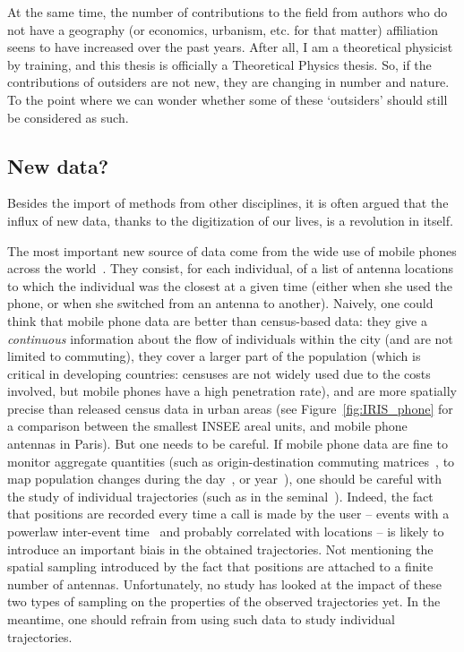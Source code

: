 At the same time, the number of contributions to the field from authors who do
not have a geography (or economics, urbanism, etc. for that matter) affiliation
seens to have increased over the past years. After all, I am a theoretical physicist
by training, and this thesis is officially a Theoretical Physics thesis. So, if
the contributions of outsiders are not new, they are changing in number and
nature. To the point where we can wonder whether some of these `outsiders'
should still be considered as such.



\subsection{New data?}
\label{sub:new_data}

Besides the import of methods from other disciplines, it is often argued that
the influx of new data, thanks to the digitization of our lives, is a revolution
in itself. 

The most important new source of data come from the wide use of mobile phones
across the world~\cite{Gonzalez:2008,Fen-Chong:2012}. They consist, for each individual, of a
list of antenna locations to which the individual was the closest at a given time
(either when she used the phone, or when she switched from an antenna to another).
Naively, one could think that mobile phone data are better than census-based
data: they give a \emph{continuous} information about the flow of individuals
within the city (and are not limited to commuting), they cover a larger part of
the population (which is critical in developing countries: censuses are not
widely used due to the costs involved, but mobile phones have a high
penetration rate), and are more spatially precise than released census data in
urban areas (see Figure~\ref{fig:IRIS_phone} for a comparison between the smallest
INSEE areal units, and mobile phone antennas in Paris). But one needs to be
careful. If mobile phone data are fine to monitor aggregate quantities (such as
origin-destination commuting matrices~\cite{Lenormand:2014}, to map
population changes during the day~\cite{Louail:2014}, or year~\cite{Deville:2014}), one should be careful with the study of
individual trajectories (such as in the
seminal~\cite{Gonzalez:2008,Song:2010_modelling,Song:2010_limits}). Indeed, the
fact that positions are recorded every time a call is made by the user -- 
events with a powerlaw inter-event time~\cite{Song:2010_modelling} and 
probably correlated with locations -- is likely to introduce an important biais in
the obtained trajectories. Not mentioning the spatial sampling introduced by the
fact that positions are attached to a finite number of antennas. Unfortunately,
no study has looked at the impact of these two types of sampling on the
properties of the observed trajectories yet. In the meantime, one should refrain
from using such data to study individual trajectories.

